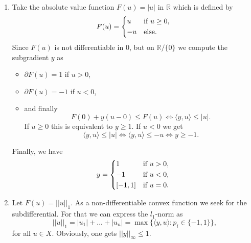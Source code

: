    \begin{example}
    \label{ex:subgradient_subdifferential}

        \begin{enumerate}
            \item Take the absolute value function $F(u) = |u|$ in $\mathbb{R}$ which is defined by
                $$
                    F(u) =
                        \begin{dcases*}
                            u & \textnormal{if $u \ge 0$,} \\
                            -u & \textnormal{else}.
                        \end{dcases*}
                $$
            Since $F(u)$ is not differentiable in $0$, but on $\mathbb{R} / \{0\}$ we compute the subgradient $y$ as
                \begin{itemize}
                    \item $\partial F(u) = 1$ if $u > 0$,
                    \item $\partial F(u) = -1$ if $u < 0$,
                    \item and finally
                        $$
                            F(0) + y(u - 0) \le F(u) \Longleftrightarrow \langle y, u \rangle \le |u|.
                        $$
                    If $u \ge 0$ this is equivalent to $y \ge 1$. If $u < 0$ we get
                        $$
                            \langle y, u \rangle \le |u| \Longleftrightarrow \langle y, u \rangle \le -u \Longleftrightarrow y \ge -1.
                        $$
                \end{itemize}
            Finally, we have
                $$
                    y =
                        \begin{dcases*}
                            1 & \textnormal{if $u > 0$,} \\
                            -1 & \textnormal{if $u < 0$,} \\
                            [-1, 1] & \textnormal{if $u = 0$.}
                        \end{dcases*}
                $$
            \item Let $F(u) = ||u||_{1}$. As a non-differentiable convex function we seek for the subdifferential. For that we can express the $l_{1}$-norm as 
                $$
                    ||u||_{1} = |u_{1}| + ... + |u_{n}| = \max \big\{ \langle y, u \rangle : p_{i} \in \{-1, 1\} \big\},
                $$
             for all $u \in X$. Obviously, one gets $||y||_{\infty} \le 1$. %

\end{enumerate}
\end{example}
